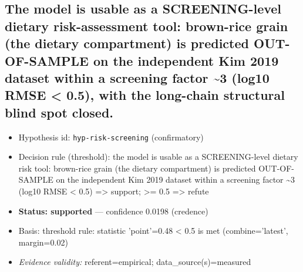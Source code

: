 \documentclass{article}
\begin{document}
\subsection{The model is usable as a SCREENING-level dietary risk-assessment tool: brown-rice grain (the dietary compartment) is predicted OUT-OF-SAMPLE on the independent Kim 2019 dataset within a screening factor \textasciitilde{}3 (log10 RMSE < 0.5), with the long-chain structural blind spot closed.}
\begin{itemize}
  \item Hypothesis id: \texttt{hyp-risk-screening} (confirmatory)
  \item Decision rule (threshold): the model is usable as a SCREENING-level dietary risk tool: brown-rice grain (the dietary compartment) is predicted OUT-OF-SAMPLE on the independent Kim 2019 dataset within a screening factor \textasciitilde{}3 (log10 RMSE < 0.5) => support; >= 0.5 => refute
  \item \textbf{Status: supported} --- confidence 0.0198 (credence)
  \item Basis: threshold rule: statistic 'point'=0.48 < 0.5 is met (combine='latest', margin=0.02)
  \item \textit{Evidence validity:} referent=empirical; data\_source(s)=measured
\end{itemize}
\end{document}
